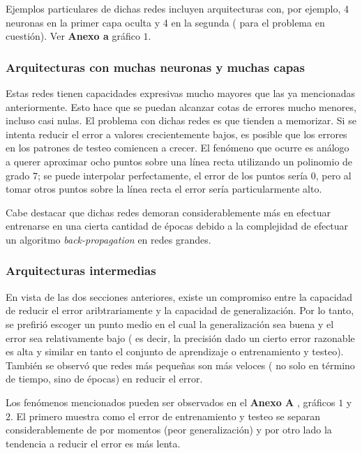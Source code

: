 \documentclass[%
    final,
    reprint,
    notitlepage,
    narroweqnarray,
    inline,
    twoside,
    invited
    ]{ieee}
\begin{document}
\par Ejemplos particulares de dichas redes incluyen arquitecturas con, por ejemplo, 4 neuronas en la primer capa oculta y 4
en la segunda ( para el problema en cuestión). Ver \textbf{Anexo a} gráfico $1$.

\subsubsection{Arquitecturas con muchas neuronas y muchas capas}

\par Estas redes tienen capacidades expresivas mucho mayores que las ya mencionadas anteriormente. Esto hace que se puedan 
alcanzar cotas de errores mucho menores, incluso casi nulas. El problema con dichas redes es que tienden a memorizar. Si 
se intenta reducir el error a valores crecientemente bajos, es posible que los errores en los patrones de testeo comiencen 
a crecer. El fenómeno que ocurre es análogo a querer aproximar ocho puntos sobre una línea recta utilizando un polinomio 
de grado $7$; se puede interpolar perfectamente, el error de los puntos sería $0$, pero al tomar otros puntos sobre 
la línea recta el error sería particularmente alto.

\par Cabe destacar que dichas redes demoran considerablemente más en efectuar entrenarse en 
una cierta cantidad de épocas debido 
a la complejidad de efectuar un algoritmo \textit{back-propagation} en redes grandes. 

\subsubsection{Arquitecturas intermedias}

\par En vista de las dos secciones anteriores, existe un compromiso entre la capacidad de reducir el error aribtrariamente 
y la capacidad de generalización. Por lo tanto, se prefirió escoger un punto medio en el cual la generalización sea buena y 
el error sea relativamente bajo ( es decir, la precisión dado un cierto error razonable es alta y similar en tanto 
el conjunto de aprendizaje o entrenamiento y testeo). También se observó que redes más pequeñas son más veloces ( 
no solo en término de tiempo, sino de épocas) en reducir el error.

\par Los fenómenos mencionados pueden ser observados en el \textbf{Anexo A} , gráficos $1$ y $2$. El primero 
muestra como el error de entrenamiento y testeo se separan considerablemente de por momentos (peor generalización) y 
por otro lado la tendencia a reducir el error es más lenta.
\end{document}
